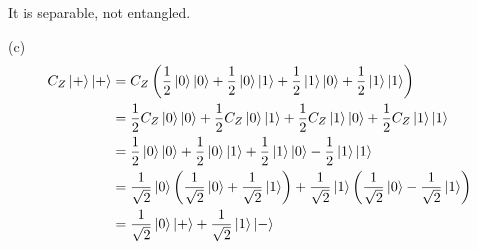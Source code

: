 \documentclass[a4paper,11pt]{article}
\begin{document}
It is separable, not entangled.

(c)
\begin{align}
    C_{Z} \ket{+}\ket{+}
    &=C_{Z}\left(\frac{1}{2}\ket{0}\ket{0} + \frac{1}{2}\ket{0}\ket{1} + \frac{1}{2}\ket{1}\ket{0} + \frac{1}{2}\ket{1}\ket{1}\right) \\
    &=\frac{1}{2}C_{Z}\ket{0}\ket{0} + \frac{1}{2}C_{Z}\ket{0}\ket{1} + \frac{1}{2}C_{Z}\ket{1}\ket{0} + \frac{1}{2}C_{Z}\ket{1}\ket{1} \\
    &=\frac{1}{2}\ket{0}\ket{0} + \frac{1}{2}\ket{0}\ket{1} + \frac{1}{2}\ket{1}\ket{0} - \frac{1}{2}\ket{1}\ket{1}\\
    &=\frac{1}{\sqrt{2}}\ket{0}\left(\frac{1}{\sqrt{2}}\ket{0} + \frac{1}{\sqrt{2}}\ket{1}\right) + \frac{1}{\sqrt{2}}\ket{1}\left(\frac{1}{\sqrt{2}}\ket{0} - \frac{1}{\sqrt{2}}\ket{1}\right)\\
    &=\frac{1}{\sqrt{2}}\ket{0}\ket{+} + \frac{1}{\sqrt{2}}\ket{1}\ket{-}
\end{align}
\end{document}
